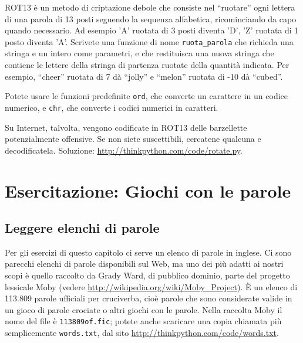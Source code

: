 \documentclass[10pt]{book}
\begin{document}
\vspace{0.2in}
\begin{exercise}


\label{exrotate}
ROT13 è un metodo di criptazione debole che consiste nel ``ruotare'' ogni lettera di una parola di 13 posti seguendo la sequenza alfabetica, ricominciando da capo quando necessario. Ad esempio 'A' ruotata di 3 posti diventa 'D', 'Z' ruotata di 1 posto diventa 'A'.
Scrivete una funzione di nome \verb"ruota_parola" che richieda una stringa e un intero come parametri, e che restituisca una nuova stringa che contiene le lettere della stringa di partenza ruotate della quantità indicata.
Per esempio, ``cheer'' ruotata di 7 dà ``jolly'' e ``melon'' ruotata di -10
dà ``cubed''.  


Potete usare le funzioni predefinite {\tt ord}, che converte un carattere in un codice numerico, e {\tt chr}, che converte i codici numerici in caratteri.

Su Internet, talvolta, vengono codificate in ROT13 delle barzellette potenzialmente offensive. Se non siete suscettibili, cercatene qualcuna e decodificatela. Soluzione: \url{http://thinkpython.com/code/rotate.py}.

\end{exercise}


\chapter{Esercitazione: Giochi con le parole}

\section{Leggere elenchi di parole}
\label{wordlist}

Per gli esercizi di questo capitolo ci serve un elenco di parole in inglese. Ci sono parecchi elenchi di parole disponibili sul Web, ma uno dei più adatti ai nostri scopi è quello raccolto da Grady Ward, di pubblico dominio, parte del progetto lessicale Moby (vedere \url{http://wikipedia.org/wiki/Moby_Project}). È un elenco di 113.809 parole ufficiali per cruciverba, cioè parole che sono considerate valide in un gioco di parole crociate o altri giochi con le parole. Nella raccolta Moby il nome del file è {\tt 113809of.fic}; potete anche scaricare una copia chiamata più semplicemente {\tt words.txt}, dal sito
\url{http://thinkpython.com/code/words.txt}.
\end{document}
